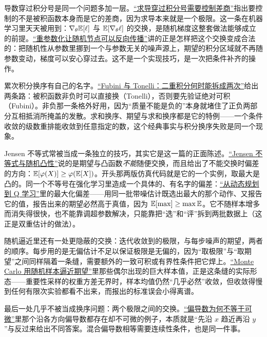 导数穿过积分号是同一个问题多加一层。\hyperref[sec:12-Real-Analysis-Support/04-Limits-and-Integration/03]{``求导穿过积分号需要控制差商''}指出要控制的不是被积函数本身而是它的差商，因为求导本来就是一个极限。这一条在机器学习里天天被用到：\(\nabla_\theta\mathbb{E}[\ell]\) 与 \(\mathbb{E}[\nabla_\theta \ell]\) 的交换，是随机梯度这整套做法能够成立的前提。\hyperref[sec:14-Deep-Learning/06-Variational-Autoencoders/02]{``重参数化让随机节点可以反向传播''}讲的正是怎样把这个交换变成合法的：把随机性从参数里挪到一个与参数无关的噪声源上，期望的积分区域就不再随参数变动，梯度可以安心穿过去。这不是一个实现技巧，是一次把条件补齐的操作。

累次积分换序有自己的名字。\hyperref[sec:12-Real-Analysis-Support/06-Product-Measures-and-Fubini/02]{``Fubini 与 Tonelli：二重积分何时能拆成两次''}给出两条路：被积函数非负时可以直接换（Tonelli），否则要先验证绝对可积（Fubini）。非负那一条格外好用，因为``质量不能是负的''本身就堵住了正负两部分互相抵消所掩盖的发散。求和换序、期望与求和换序都是它的特例——一个条件收敛的级数重排能收敛到任意指定的数，这个经典事实与积分换序失败是同一个现象。

Jensen 不等式常被当成一条独立的技巧，其实它是这一篇的正面陈述。\hyperref[sec:05-Probability/07-Transforms-and-Bounds/03]{``Jensen 不等式与随机凸性''}说的是期望与凸函数\emph{不能}随便交换，而且给出了不能交换时偏差的方向：\(\mathbb{E}[\varphi(X)]\ge\varphi(\mathbb{E}[X])\)。开头那两版仿真代码就是它的一个实例，取最大是凸的。同一个不等号在强化学习里造成一个具体的、有名字的偏差：\hyperref[sec:16-Control-and-Reinforcement-Learning/02-Reinforcement-Learning/04]{``从动态规划到 Q 学习''}里的最大化偏差——用同一批带噪估计既选出最大的那个动作、又报告它的值，报告出来的期望必然高于真值，因为 \(\mathbb{E}[\max]\ge\max\mathbb{E}\)。它不随样本增多而消失得很快，也不能靠调超参数解决，只能靠把``选''和``评''拆到两批数据上（这正是双重估计的做法）。

随机逼近里还有一处更隐蔽的交换：迭代收敛到的极限，与每步噪声的期望，两者的顺序。每步用的是无偏估计不足以保证极限是无偏的，因为``取极限''与``取期望''之间同样隔着一条缝，需要额外的一致可积或有界性条件把它焊上。\hyperref[sec:13-Machine-Learning/08-Sampling-and-Inference/01]{``Monte Carlo 用随机样本逼近期望''}里那些偶尔出现的巨大样本值，正是这条缝的实际形态——重要性采样的权重方差无界时，样本均值仍然``几乎必然''收敛，但收敛得慢到任何有限次实验都看不出来，而报出的标准误会小得离谱。

最后一处几乎不被当成换序问题：两个极限之间的交换。\hyperref[sec:02-Calculus/06-Multivariable-Calculus/02]{``偏导数为何不等于可微''}里那个沿各方向偏导数都存在却不可微的例子，本质就是``先沿 \(x\) 趋近再沿 \(y\)''与反过来给出不同答案。混合偏导数相等需要连续性条件，也是同一件事。

